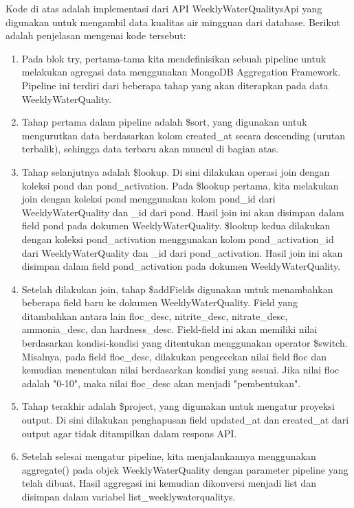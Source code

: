 \begin{enumerate}[1.]
Kode di atas adalah implementasi dari API WeeklyWaterQualitysApi yang digunakan untuk mengambil data kualitas air mingguan dari database. Berikut adalah penjelasan mengenai kode tersebut:

\begin{enumerate}

\item Pada blok try, pertama-tama kita mendefinisikan sebuah pipeline untuk melakukan agregasi data menggunakan MongoDB Aggregation Framework. Pipeline ini terdiri dari beberapa tahap yang akan diterapkan pada data WeeklyWaterQuality.

\item Tahap pertama dalam pipeline adalah \$sort, yang digunakan untuk mengurutkan data berdasarkan kolom created\_at secara descending (urutan terbalik), sehingga data terbaru akan muncul di bagian atas.

\item Tahap selanjutnya adalah \$lookup. Di sini dilakukan operasi join dengan koleksi pond dan pond\_activation. Pada \$lookup pertama, kita melakukan join dengan koleksi pond menggunakan kolom pond\_id dari WeeklyWaterQuality dan \_id dari pond. Hasil join ini akan disimpan dalam field pond pada dokumen WeeklyWaterQuality. \$lookup kedua dilakukan dengan koleksi pond\_activation menggunakan kolom pond\_activation\_id dari WeeklyWaterQuality dan \_id dari pond\_activation. Hasil join ini akan disimpan dalam field pond\_activation pada dokumen WeeklyWaterQuality.

\item Setelah dilakukan join, tahap \$addFields digunakan untuk menambahkan beberapa field baru ke dokumen WeeklyWaterQuality. Field yang ditambahkan antara lain floc\_desc, nitrite\_desc, nitrate\_desc, ammonia\_desc, dan hardness\_desc. Field-field ini akan memiliki nilai berdasarkan kondisi-kondisi yang ditentukan menggunakan operator \$switch. Misalnya, pada field floc\_desc, dilakukan pengecekan nilai field floc dan kemudian menentukan nilai berdasarkan kondisi yang sesuai. Jika nilai floc adalah "0-10", maka nilai floc\_desc akan menjadi "pembentukan".

\item Tahap terakhir adalah \$project, yang digunakan untuk mengatur proyeksi output. Di sini dilakukan penghapusan field updated\_at dan created\_at dari output agar tidak ditampilkan dalam respons API.

\item Setelah selesai mengatur pipeline, kita menjalankannya menggunakan aggregate() pada objek WeeklyWaterQuality dengan parameter pipeline yang telah dibuat. Hasil aggregasi ini kemudian dikonversi menjadi list dan disimpan dalam variabel list\_weeklywaterqualitys.


\end{enumerate}
\end{enumerate}
